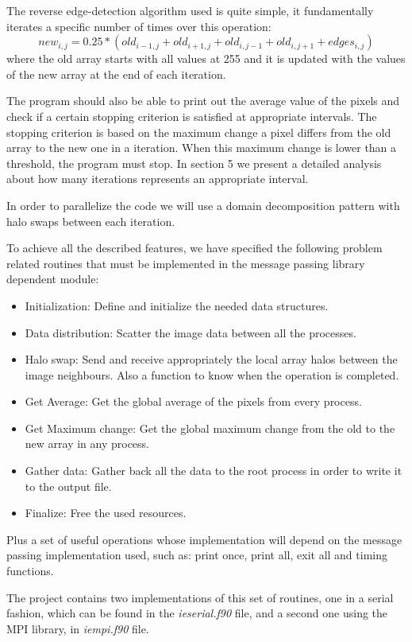 \documentclass[12pt, a4paper, oneside]{article}
\begin{document}
The reverse edge-detection algorithm used is quite simple, it fundamentally iterates a specific number of times over this operation:
$$ new_{i,j} = 0.25 * (old_{i-1,j}+old_{i+1,j}+old_{i,j-1}+old_{i,j+1}+edges_{i,j}) $$
where the old array starts with all values at 255 and it is updated with the values of the new array at the end of each iteration.

The program should also be able to print out the average value of the pixels and check if a certain stopping criterion is satisfied at appropriate intervals.
The stopping criterion is based on the maximum change a pixel differs from the old array to the new one in a iteration.
When this maximum change is lower than a threshold, the program must stop.
In section 5 we present a detailed analysis about how many iterations represents an appropriate interval.

In order to parallelize the code we will use a domain decomposition pattern with halo swaps between each iteration.

To achieve all the described features, we have specified the following problem related routines that must be implemented in the message passing library dependent module:
\begin{itemize}
    \item Initialization: Define and initialize the needed data structures.
    \item Data distribution: Scatter the image data between all the processes.
    \item Halo swap: Send and receive appropriately the local array halos between the image neighbours. Also a function to know when the operation is completed.
    \item Get Average: Get the global average of the pixels from every process.
    \item Get Maximum change: Get the global maximum change from the old to the new array in any process.
    \item Gather data: Gather back all the data to the root process in order to write it to the output file.
    \item Finalize: Free the used resources.
\end{itemize}
Plus a set of useful operations whose implementation will depend on the message passing implementation used, such as: print once, print all, exit all and timing functions.

The project contains two implementations of this set of routines, one in a serial fashion, which can be found in the \emph{ieserial.f90} file, and a second one using the MPI library, in \emph{iempi.f90} file.
\end{document}
